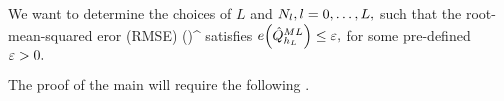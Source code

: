  
 We want to determine the choices of $L$ and $N_{l}, l = 0,\ldots,L,$ such that the root-mean-squared eror (RMSE)
 \beqs
 \err{\QhatMLhL} \de \mleft(\mright)^{\half}
 \eeqs
 satisfies $\err{\QhatMLhL} \leq \eps,$ for some pre-defined $\varepsilon > 0.$

The proof of the main  will require the following .



%



%

